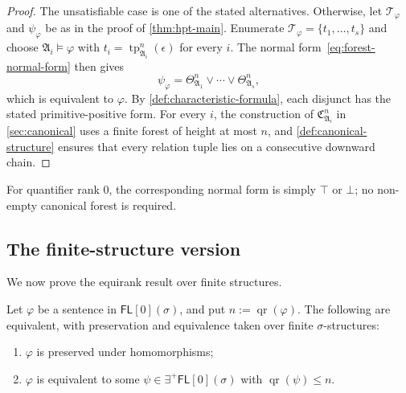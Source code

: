 \documentclass{lmcs}
\newcommand{\FL}{\mathsf{FL}}
\newcommand{\EPFL}{\exists^{+}\!\mathsf{FL}}
\newcommand{\qr}{\operatorname{qr}}
\newcommand{\tp}{\operatorname{tp}}
\newcommand{\true}{\top}
\newcommand{\false}{\bot}
\newcommand{\A}{\mathfrak{A}}
\newcommand{\C}{\mathfrak{C}}
\begin{document}
\begin{proof}
The unsatisfiable case is one of the stated alternatives.  Otherwise,
let $\mathcal T_{\varphi}$ and $\psi_{\varphi}$ be as in the proof of
\cref{thm:hpt-main}.  Enumerate
$\mathcal T_{\varphi}=\{t_1,\ldots,t_s\}$ and choose
$\A_i\models\varphi$ with $t_i=\tp_{\A_i}^{n}(\epsilon)$ for every $i$.  The
normal form~\eqref{eq:forest-normal-form} then gives
\[
  \psi_{\varphi}
  =\Theta_{\A_1}^{n}\vee\cdots\vee\Theta_{\A_s}^{n},
\]
which is equivalent to $\varphi$.  By \cref{def:characteristic-formula}, each
disjunct has the stated primitive-positive form.  For every $i$, the
construction of $\C_{\A_i}^{n}$ in \cref{sec:canonical} uses a finite forest
of height at most $n$, and \cref{def:canonical-structure} ensures that every
relation tuple lies on a consecutive downward chain.
\end{proof}

For quantifier rank $0$, the corresponding normal form is simply $\true$ or
$\false$; no non-empty canonical forest is required.

\subsection{The finite-structure version}\label{sec:finite-hpt}

We now prove the equirank result over finite structures.

\begin{thm}\label{thm:finite-hpt}
Let $\varphi$ be a sentence in $\FL[0](\sigma)$, and put
$n:=\qr(\varphi)$.  The following are
equivalent, with preservation and equivalence taken over finite
$\sigma$-structures:
\begin{enumerate}[label=\textup{(\roman*)}]
  \item $\varphi$ is preserved under homomorphisms;
  \item $\varphi$ is equivalent to some $\psi\in\EPFL[0](\sigma)$ with
  $\qr(\psi)\leq n$.
\end{enumerate}
\end{thm}
\end{document}
